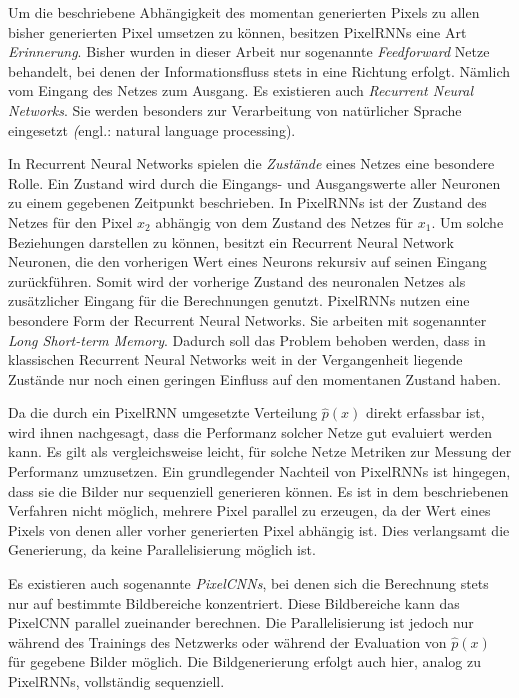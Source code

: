 Um die beschriebene Abhängigkeit des momentan generierten Pixels zu allen bisher generierten Pixel umsetzen zu können, besitzen \acp{PixelRNN} eine Art \emph{Erinnerung}. Bisher wurden in dieser Arbeit nur sogenannte \emph{Feedforward} Netze behandelt, bei denen der Informationsfluss stets in eine Richtung erfolgt. Nämlich vom Eingang des Netzes zum Ausgang. Es existieren auch \emph{Recurrent Neural Networks}. Sie werden besonders zur Verarbeitung von natürlicher Sprache eingesetzt \emph(engl.: natural language processing).


In Recurrent Neural Networks spielen die \emph{Zustände} eines Netzes eine besondere Rolle. Ein Zustand wird durch die Eingangs- und Ausgangswerte aller Neuronen zu einem gegebenen Zeitpunkt beschrieben. In \acp{PixelRNN} ist der Zustand des Netzes für den Pixel $x_{2}$ abhängig von dem Zustand des Netzes für $x_{1}$. Um solche Beziehungen darstellen zu können, besitzt ein Recurrent Neural Network Neuronen, die den vorherigen Wert eines Neurons rekursiv auf seinen Eingang zurückführen. Somit wird der vorherige Zustand des neuronalen Netzes als zusätzlicher Eingang für die Berechnungen genutzt. \acp{PixelRNN} nutzen eine besondere Form der Recurrent Neural Networks. Sie arbeiten mit sogenannter \emph{Long Short-term Memory}. Dadurch soll das Problem behoben werden, dass in klassischen Recurrent Neural Networks weit in der Vergangenheit liegende Zustände nur noch einen geringen Einfluss auf den momentanen Zustand haben. \cite{generativeModelsSurvey}

Da die durch ein \ac{PixelRNN} umgesetzte Verteilung $\hat{p}(x)$ direkt erfassbar ist, wird ihnen nachgesagt, dass die Performanz solcher Netze gut evaluiert werden kann. Es gilt als vergleichsweise leicht, für solche Netze Metriken zur Messung der Performanz umzusetzen. Ein grundlegender Nachteil von \acp{PixelRNN} ist hingegen, dass sie die Bilder nur sequenziell generieren können. Es ist in dem beschriebenen Verfahren nicht möglich, mehrere Pixel parallel zu erzeugen, da der Wert eines Pixels von denen aller vorher generierten Pixel abhängig ist. Dies verlangsamt die Generierung, da keine Parallelisierung möglich ist. \cite{generativeModelsSurvey}

Es existieren auch sogenannte \emph{PixelCNNs}, bei denen sich die Berechnung stets nur auf bestimmte Bildbereiche konzentriert. Diese Bildbereiche kann das PixelCNN parallel zueinander berechnen. Die Parallelisierung ist jedoch nur während des Trainings des Netzwerks oder während der Evaluation von $\hat{p}(x)$ für gegebene Bilder möglich. Die Bildgenerierung erfolgt auch hier, analog zu \acp{PixelRNN}, vollständig sequenziell. \cite{pixelRNN}

